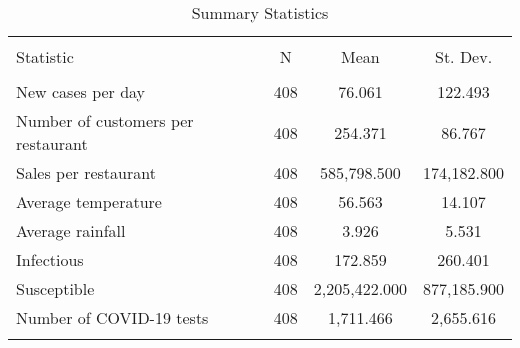 
\begin{table}[!htbp] \centering 
  \caption{Summary Statistics} 
  \label{} 
\begin{tabular}{@{\extracolsep{5pt}}lccc} 
\\[-1.8ex]\hline 
\hline \\[-1.8ex] 
Statistic & \multicolumn{1}{c}{N} & \multicolumn{1}{c}{Mean} & \multicolumn{1}{c}{St. Dev.} \\ 
\hline \\[-1.8ex] 
New cases per day & 408 & 76.061 & 122.493 \\ 
Number of customers per restaurant & 408 & 254.371 & 86.767 \\ 
Sales per restaurant & 408 & 585,798.500 & 174,182.800 \\ 
Average temperature & 408 & 56.563 & 14.107 \\ 
Average rainfall & 408 & 3.926 & 5.531 \\ 
Infectious & 408 & 172.859 & 260.401 \\ 
Susceptible & 408 & 2,205,422.000 & 877,185.900 \\ 
Number of COVID-19 tests & 408 & 1,711.466 & 2,655.616 \\ 
\hline \\[-1.8ex] 
\end{tabular} 
\end{table} 
